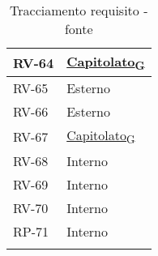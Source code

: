 \begin{longtable}{|>{\centering\arraybackslash}m{}|>{\centering\arraybackslash}m{}|}
	RV-64           & \href{https://7last.github.io/docs/rtb/documentazione-interna/glossario\#capitolato}{Capitolato\textsubscript{G}} \\\hline
	RV-65           & Esterno                                                                                                           \\\hline
	RV-66           & Esterno                                                                                                           \\\hline
	RV-67           & \href{https://7last.github.io/docs/rtb/documentazione-interna/glossario\#capitolato}{Capitolato\textsubscript{G}} \\\hline
	RV-68           & Interno                                                                                                           \\\hline
	RV-69           & Interno                                                                                                           \\\hline
	RV-70           & Interno                                                                                                           \\\hline
	RP-71           & Interno        \\\hline

	\caption{Tracciamento requisito - fonte}
\end{longtable}

